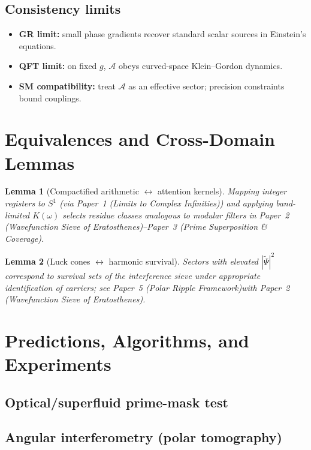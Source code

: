 \documentclass[12pt]{article}
\newcommand{\Afield}{\mathcal{A}}    %
\newcommand{\Psit}{\tilde{\Psi}}     %
\newcommand{\Circle}{S^1}
\newcommand{\PaperI}{Paper~1 (Limits to Complex Infinities)}
\newcommand{\PaperII}{Paper~2 (Wavefunction Sieve of Eratosthenes)}
\newcommand{\PaperIII}{Paper~3 (Prime Superposition \& Coverage)}
\newcommand{\PaperV}{Paper~5 (Polar Ripple Framework)}
\theoremstyle{plain}
\newtheorem{lemma}{Lemma}
\theoremstyle{definition}
\theoremstyle{remark}
\begin{document}
\subsection{Consistency limits}
\begin{itemize}[leftmargin=1.1em]
  \item \textbf{GR limit:} small phase gradients recover standard scalar sources in Einstein’s equations.
  \item \textbf{QFT limit:} on fixed \(g\), \(\Afield\) obeys curved-space Klein–Gordon dynamics.
  \item \textbf{SM compatibility:} treat \(\Afield\) as an effective sector; precision constraints bound couplings.
\end{itemize}

\section{Equivalences and Cross-Domain Lemmas}
\begin{lemma}[Compactified arithmetic \(\leftrightarrow\) attention kernels]
Mapping integer registers to \(\Circle\) (via \PaperI) and applying band-limited \(K(\omega)\) selects residue classes analogous to modular filters in \PaperII–\PaperIII.
\end{lemma}

\begin{lemma}[Luck cones \(\leftrightarrow\) harmonic survival]
Sectors with elevated \(|\Psit|^2\) correspond to survival sets of the interference sieve under appropriate identification of carriers; see \PaperV with \PaperII.
\end{lemma}

\section{Predictions, Algorithms, and Experiments}
\subsection{Optical/superfluid prime-mask test}
\subsection{Angular interferometry (polar tomography)}
\end{document}
